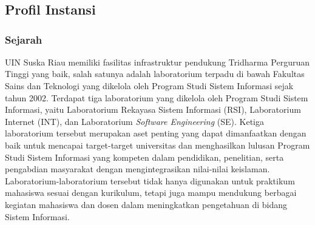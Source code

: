 




\chapter{\babDua}
\section{Profil Instansi}
\subsection{Sejarah}
UIN Suska Riau memiliki fasilitas infrastruktur pendukung Tridharma Perguruan Tinggi yang baik, salah satunya adalah laboratorium terpadu di bawah Fakultas Sains dan Teknologi yang dikelola oleh Program Studi Sistem Informasi sejak tahun 2002. Terdapat tiga laboratorium yang dikelola oleh Program Studi Sistem Informasi, yaitu Laboratorium Rekayasa Sistem Informasi (RSI), Laboratorium Internet (INT), dan Laboratorium \textit{Software Engineering} (SE). Ketiga laboratorium tersebut merupakan aset penting yang dapat dimanfaatkan dengan baik untuk mencapai target-target universitas dan menghasilkan lulusan Program Studi Sistem Informasi yang kompeten dalam pendidikan, penelitian, serta pengabdian masyarakat dengan mengintegrasikan nilai-nilai keislaman. Laboratorium-laboratorium tersebut tidak hanya digunakan untuk praktikum mahasiswa sesuai dengan kurikulum, tetapi juga mampu mendukung berbagai kegiatan mahasiswa dan dosen dalam meningkatkan pengetahuan di bidang Sistem Informasi.
